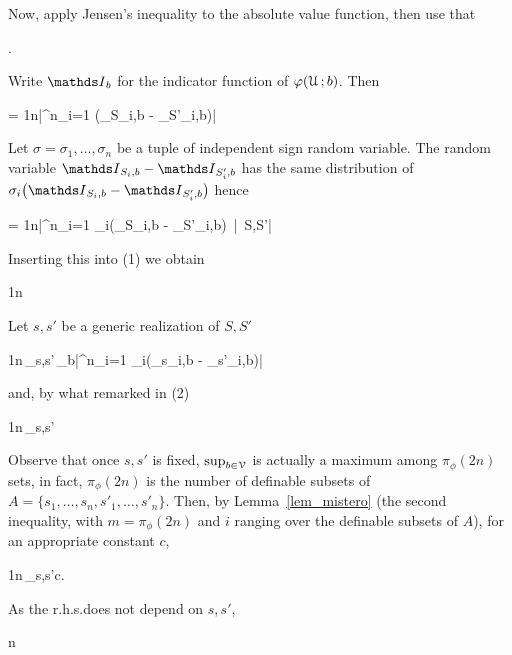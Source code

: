\documentclass[scombinatorics.tex]{subfiles}
\begin{document}
  Now, apply Jensen's inequality to the absolute value function, then use that 

  {\le}
  {\Ex{}.}

  Write $\Indicator_b$ for the indicator function of $\varphi(\EuScript U\,;b)$.
  Then

  {=}
  {\frac1n\bigg|\sum^n_{i=1} \Big(\Indicator_{S_i,b} -  \Indicator_{S'_i,b}\Big)\bigg|}

  Let $\sigma=\sigma_1,\dots,\sigma_n$ be a tuple of independent sign random variable.
  The random variable $\Indicator_{S_i,b} -  \Indicator_{S'_i,b}$ has the same distribution of $\sigma_i\big(\Indicator_{S_i,b} -  \Indicator_{S'_i,b}\big)$ hence

  \ceq{}
  {=}
  {\frac1n\Ex\bigg|\sum^n_{i=1} \sigma_i\Big(\Indicator_{S_i,b} -  \Indicator_{S'_i,b}\Big)\ \Big|\ S,S'\bigg|}

  Inserting this into (1) we obtain

  {\le}
  {\frac1n\,\Ex\bigg[\sup_{b\in\V}\Ex\bigg|\sum^n_{i=1} \sigma_i\Big(\Indicator_{S_i,b} -  \Indicator_{S'_i,b}\Big)\ \Big|\ S,S'\bigg|\bigg]}

  Let $s,s'$ be a generic realization of $S,S'$

  \ceq{}
  {\le}
  {\frac1n\,\sup_{s,s'}\,\sup_{b\in\V}\Ex\bigg|\sum^n_{i=1} \sigma_i\big(\Indicator_{s_i,b} -  \Indicator_{s'_i,b}\big)\bigg|}

  and, by what remarked in (2)

  \ceq{}
  {\le}
  {\frac1n\,\sup_{s,s'}\Ex\bigg[\sup_{b\in\V}\bigg|\sum^n_{i=1} \sigma_i\big(\Indicator_{s_i,b} -  \Indicator_{s'_i,b}\big)\bigg|\bigg]}

  Observe that once $s,s'$ is fixed, $\sup_{b\in\EuScript V}$ is actually a maximum among $\pi_\phi(2n)$ sets, in fact, $\pi_\phi(2n)$ is the number of definable subsets of $A=\{s_1,\dots,s_n,s'_1,\dots,s'_n\}$.
  Then, by Lemma~\ref{lem_mistero} (the second inequality, with $m =\pi_\phi(2n)$ and $i$ ranging over the definable subsets of $A$), for an appropriate constant $c$,

  \ceq{}
  {\le}
  {\frac1n\,\sup_{s,s'}c.}

  As the r.h.s.\@ does not depend on $s,s'$,

  \ceq{}
  {\le}
  {n}
\end{document}
